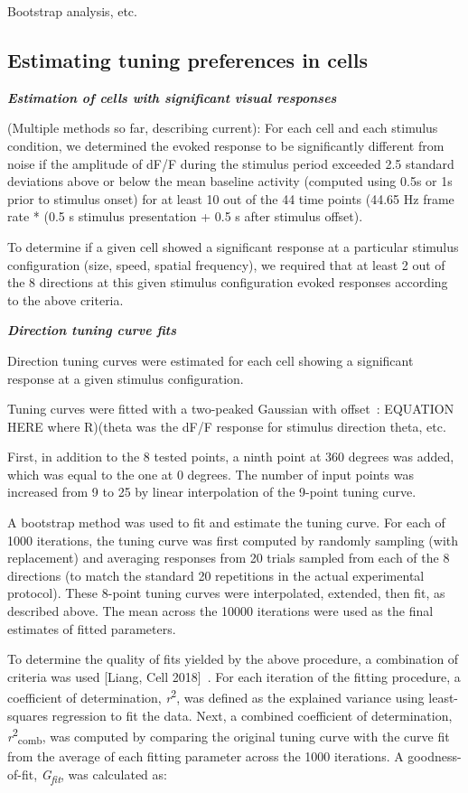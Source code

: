 \documentclass{article}
\begin{document}
Bootstrap analysis, etc.


\subsection{Estimating tuning preferences in cells}

\textbf{\textit{Estimation of cells with significant visual responses}}

(Multiple methods so far, describing current):  For each cell and each stimulus condition, we determined the evoked response to be significantly different from noise if the amplitude of dF/F during the stimulus period exceeded 2.5 standard deviations above or below the mean baseline activity (computed using 0.5s or 1s prior to stimulus onset) for at least 10 out of the 44 time points (44.65 Hz frame rate * (0.5 s stimulus presentation + 0.5 s after stimulus offset).

To determine if a given cell showed a significant response at a particular stimulus configuration (size, speed, spatial frequency), we required that at least 2 out of the 8 directions at this given stimulus configuration evoked responses according to the above criteria. 

\textbf{\textit{Direction tuning curve fits}}

Direction tuning curves were estimated for each cell showing a significant response at a given stimulus configuration. 

Tuning curves were fitted with a two-peaked Gaussian with offset~\cite{somanypaper, alotofthem}:
EQUATION HERE
where R)(theta was the dF/F response for stimulus direction theta, etc.

First, in addition to the 8 tested points, a ninth point at 360 degrees was added, which was equal to the one at 0 degrees. The number of input points was increased from 9 to 25 by linear interpolation of the 9-point tuning curve. 

A bootstrap method was used to fit and estimate the tuning curve.  For each of 1000 iterations, the tuning curve was first computed by randomly sampling (with replacement) and averaging responses from 20 trials sampled from each of the 8 directions (to match the standard 20 repetitions in the actual experimental protocol). These 8-point tuning curves were interpolated, extended, then fit, as described above. The mean across the 10000 iterations were used as the final estimates of fitted parameters. 

To determine the quality of fits yielded by the above procedure, a combination of criteria was used [Liang, Cell 2018]~\cite{Liang2018cell}. For each iteration of the fitting procedure, a coefficient of determination, \textit{r}\textsuperscript{2}, was defined as the explained variance using least-squares regression to fit the data. Next, a combined coefficient of determination, \textit{r}\textsuperscript{2}\textsubscript{comb}, was computed by comparing the original tuning curve with the curve fit from the average of each fitting parameter across the 1000 iterations. A goodness-of-fit, \textit{G}\textit{\textsubscript{fit}}, was calculated as:
\end{document}
